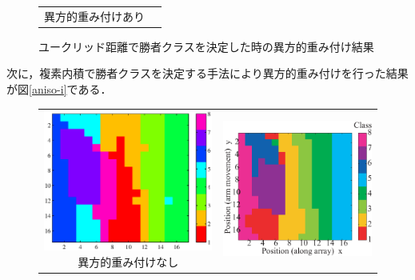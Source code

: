 ﻿\documentclass[12pt,oneside]{jsbook}
\begin{document}
\begin{figure}[btp]
\begin{center}
\begin{tabular}{cc}
\begin{minipage}{0.5\hsize}
\centering\textmd{異方的重み付けあり}
   \end{minipage}
\end{tabular}
\caption{ユークリッド距離で勝者クラスを決定した時の異方的重み付け結果}
\label{aniso-e}
 \end{center}
\end{figure}

次に，複素内積で勝者クラスを決定する手法により異方的重み付けを行った結果
が図\ref{aniso-i}である．

\begin{figure}[btp]
 \begin{center}
\begin{tabular}{cc}
   \begin{minipage}{0.5\hsize}
\includegraphics[width =\hsize ]{SOM_mine6_02005_i_raw.eps}
\centering\textmd{異方的重み付けなし}
   \end{minipage}
&
   \begin{minipage}{0.5\hsize}
\includegraphics[width =\hsize ]{SOM_mine6_02005_i_wsqrt.eps}

\end{minipage}
\end{tabular}
\end{center}
\end{figure}
\end{document}
